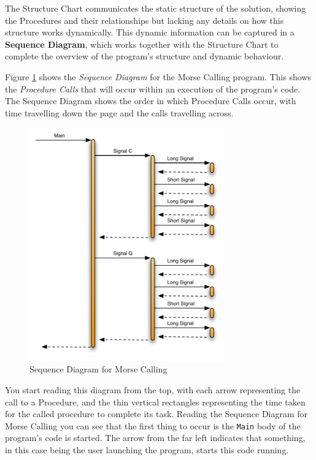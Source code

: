 The Structure Chart communicates the static structure of the solution, showing the Procedures and their relationships but lacking any details on how this structure works dynamically. This dynamic information can be captured in a \textbf{Sequence Diagram}, which works together with the Structure Chart to complete the overview of the program's structure and dynamic behaviour.

Figure \ref{fig:procedure-decl-morsecalling-sequence} shows the \emph{Sequence Diagram} for the Morse Calling program. This shows the \emph{Procedure Calls} that will occur within an execution of the program's code. The Sequence Diagram shows the order in which Procedure Calls occur, with time travelling down the page and the calls travelling across. 

\begin{figure}[htbp]
   \centering
   \includegraphics[width=0.75\textwidth]{./topics/procedure-decl/diagrams/MorseCallingSequenceDiagram} 
   \caption{Sequence Diagram for Morse Calling}
   \label{fig:procedure-decl-morsecalling-sequence}
\end{figure}

You start reading this diagram from the top, with each arrow representing the call to a Procedure, and the thin vertical rectangles representing the time taken for the called procedure to complete its task. Reading the Sequence Diagram for Morse Calling you can see that the first thing to occur is the \texttt{Main} body of the program's code is started. The arrow from the far left indicates that something, in this case being the user launching the program, starts this code running.

